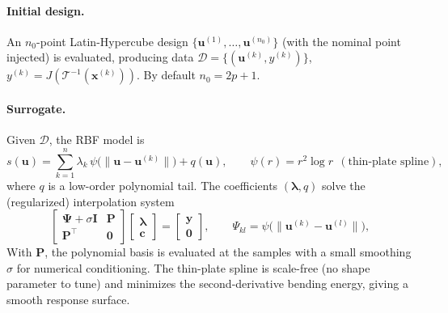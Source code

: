\documentclass{article}
\newcommand{\xv}{\bm{x}}
\begin{document}
\paragraph{Initial design.} An $n_0$-point Latin-Hypercube design
\citep{McKay1979} $\{\bm{u}^{(1)},\dots,\bm{u}^{(n_0)}\}$ (with the nominal point
injected) is evaluated, producing data $\mathcal{D}=\{(\bm{u}^{(k)},y^{(k)})\}$,
$y^{(k)}=J(\mathcal{T}^{-1}(\xv^{(k)}))$. By default $n_0=2p+1$.

\paragraph{Surrogate.} Given $\mathcal{D}$, the RBF model is
\begin{equation}
  s(\bm{u})=\sum_{k=1}^{n}\lambda_k\,\psi\big(\lVert\bm{u}-\bm{u}^{(k)}\rVert\big)
  +q(\bm{u}),
  \qquad
  \psi(r)=r^{2}\log r \ \ (\text{thin-plate spline}),
  \label{eq:rbf}
\end{equation}
where $q$ is a low-order polynomial tail. The coefficients $(\bm{\lambda},q)$ solve
the (regularized) interpolation system
\begin{equation}
  \begin{bmatrix} \bm{\Psi}+\sigma\bm{I} & \bm{P}\\ \bm{P}^{\!\top} & \bm{0}\end{bmatrix}
  \begin{bmatrix}\bm{\lambda}\\ \bm{c}\end{bmatrix}
  =\begin{bmatrix}\bm{y}\\ \bm{0}\end{bmatrix},
  \qquad
  \Psi_{kl}=\psi\big(\lVert\bm{u}^{(k)}-\bm{u}^{(l)}\rVert\big),
  \label{eq:rbf-system}
\end{equation}
With $\bm{P}$, the polynomial basis is evaluated at the samples with a small smoothing
$\sigma$ for numerical conditioning. The thin-plate spline is scale-free (no shape
parameter to tune) and minimizes the second-derivative bending energy, giving a
smooth response surface.
\end{document}
